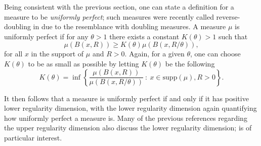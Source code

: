 Being consistent with the previous section, one can state a definition for a measure to be \textit{uniformly perfect}; such measures were recently called reverse-doubling in \cite{anti2} due to the resemblance with doubling measures. A measure $\mu$ is uniformly perfect if for any $\theta > 1$ there exists a constant $K(\theta) > 1$ such that 
\begin{equation}\label{uniformly-perfect-equa}
\mu(B(x,R)) \ge K(\theta) \mu(B(x,R/\theta)),
\end{equation}
for all $x$ in the support of $\mu$ and $R > 0$. Again, for a given $\theta$, one can choose $K(\theta)$ to be as small as possible by letting $K(\theta)$ be the following
\[
K(\theta) = \inf \left\{ \frac{\mu(B(x,R))}{\mu(B(x,R/\theta))} \ : \ x \in \text{supp}(\mu), R>0 \right\}.
\]


It then follows that a measure is uniformly perfect if and only if it has positive lower regularity dimension, with the lower regularity dimension again quantifying how uniformly perfect a measure is. Many of the previous references regarding the upper regularity dimension also discuss the lower regularity dimension; \cite{hare-troscheit} is  of particular interest.
